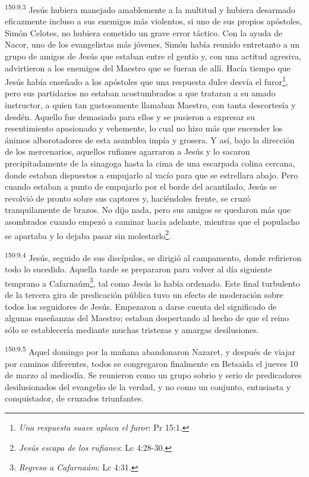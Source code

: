 \par
\textsuperscript{150:9.3} Jesús hubiera manejado amablemente a la multitud y hubiera desarmado eficazmente incluso a sus enemigos más violentos, si uno de sus propios apóstoles, Simón Celotes, no hubiera cometido un grave error táctico. Con la ayuda de Nacor, uno de los evangelistas más jóvenes, Simón había reunido entretanto a un grupo de amigos de Jesús que estaban entre el gentío y, con una actitud agresiva, advirtieron a los enemigos del Maestro que se fueran de allí. Hacía tiempo que Jesús había enseñado a los apóstoles que una respuesta dulce desvía el furor\footnote{\textit{Una respuesta suave aplaca el furor}: Pr 15:1.}, pero sus partidarios no estaban acostumbrados a que trataran a su amado instructor, a quien tan gustosamente llamaban Maestro, con tanta descortesía y desdén. Aquello fue demasiado para ellos y se pusieron a expresar su resentimiento apasionado y vehemente, lo cual no hizo más que encender los ánimos alborotadores de esta asamblea impía y grosera. Y así, bajo la dirección de los mercenarios, aquellos rufianes agarraron a Jesús y lo sacaron precipitadamente de la sinagoga hasta la cima de una escarpada colina cercana, donde estaban dispuestos a empujarlo al vacío para que se estrellara abajo. Pero cuando estaban a punto de empujarlo por el borde del acantilado, Jesús se revolvió de pronto sobre sus captores y, haciéndoles frente, se cruzó tranquilamente de brazos. No dijo nada, pero sus amigos se quedaron más que asombrados cuando empezó a caminar hacia adelante, mientras que el populacho se apartaba y lo dejaba pasar sin molestarlo\footnote{\textit{Jesús escapa de los rufianes}: Lc 4:28-30.}.

\par
\textsuperscript{150:9.4} Jesús, seguido de sus discípulos, se dirigió al campamento, donde refirieron todo lo sucedido. Aquella tarde se prepararon para volver al día siguiente temprano a Cafarnaúm\footnote{\textit{Regreso a Cafarnaúm}: Lc 4:31.}, tal como Jesús lo había ordenado. Este final turbulento de la tercera gira de predicación pública tuvo un efecto de moderación sobre todos los seguidores de Jesús. Empezaron a darse cuenta del significado de algunas enseñanzas del Maestro; estaban despertando al hecho de que el reino sólo se establecería mediante muchas tristezas y amargas desilusiones.

\par
\textsuperscript{150:9.5} Aquel domingo por la mañana abandonaron Nazaret, y después de viajar por caminos diferentes, todos se congregaron finalmente en Betsaida el jueves 10 de marzo al mediodía. Se reunieron como un grupo sobrio y serio de predicadores desilusionados del evangelio de la verdad, y no como un conjunto, entusiasta y conquistador, de cruzados triunfantes.